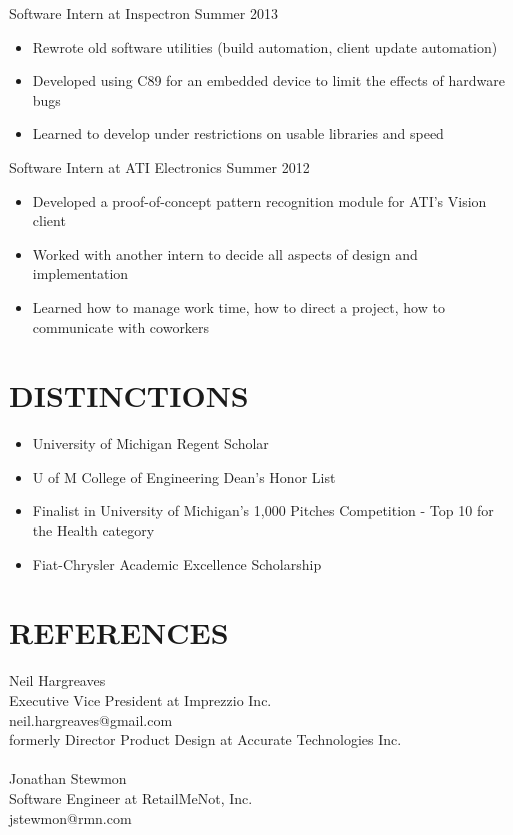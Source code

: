 \documentclass[line,margin]{res}
\begin{document}
\begin{resume}
                {\sc Software Intern at Inspectron} \hfill Summer 2013
                 \begin{itemize}  \itemsep -2pt %
                 \item Rewrote old software utilities (build automation, client update automation)
                 \item Developed using C89 for an embedded device to limit the effects of hardware bugs
                 \item Learned to develop under restrictions on usable libraries and speed
                 \end{itemize}
 
                {\sc Software Intern at ATI Electronics} \hfill            Summer 2012
                 \begin{itemize}  \itemsep -2pt %
                 \item Developed a proof-of-concept pattern recognition module for ATI’s Vision client
                 \item Worked with another intern to decide all aspects of design and implementation
                 \item Learned how to manage work time, how to direct a project, how to communicate with coworkers
                 \end{itemize} 

\section{\textcolor{HeaderColor}{DISTINCTIONS}}
    \begin{itemize} \itemsep-0.2em
    \item University of Michigan Regent Scholar
    \item U of M College of Engineering Dean’s Honor List
    \item Finalist in University of Michigan’s 1,000 Pitches Competition - Top 10 for the Health category
    \item Fiat-Chrysler Academic Excellence Scholarship
    \end{itemize}
 
\section{\textcolor{HeaderColor}{REFERENCES}}
    Neil Hargreaves\\
    Executive Vice President at Imprezzio Inc.\\
    neil.hargreaves@gmail.com\\
    formerly Director Product Design at Accurate Technologies Inc.\\
\\
    Jonathan Stewmon\\
    Software Engineer at RetailMeNot, Inc.\\
    jstewmon@rmn.com\\
 

\end{resume}
\end{document}
